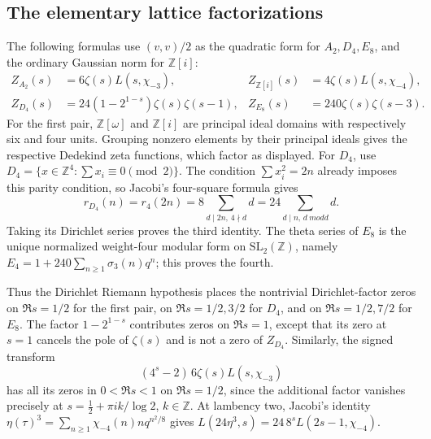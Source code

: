 \subsection{The elementary lattice factorizations}
The following formulas use $(v,v)/2$ as the quadratic form for $A_2,D_4,E_8$,
and the ordinary Gaussian norm for $\mathbb Z[i]$:
\begin{align}
 Z_{A_2}(s)&=6\zeta(s)L(s,\chi_{-3}),&
 Z_{\mathbb Z[i]}(s)&=4\zeta(s)L(s,\chi_{-4}),\label{eq:CM-Epstein}\\
 Z_{D_4}(s)&=24(1-2^{1-s})\zeta(s)\zeta(s-1),&
 Z_{E_8}(s)&=240\zeta(s)\zeta(s-3).\label{eq:DE-Epstein}
\end{align}
For the first pair, $\mathbb Z[\omega]$ and $\mathbb Z[i]$ are principal
ideal domains with respectively six and four units.  Grouping nonzero
elements by their principal ideals gives the respective Dedekind zeta
functions, which factor as displayed.  For $D_4$, use
$D_4=\{x\in\mathbb Z^4:\sum x_i\equiv0\pmod2\}$.
The condition $\sum x_i^2=2n$ already imposes this parity condition, so
Jacobi's four-square formula gives
\[
 r_{D_4}(n)=r_4(2n)=8\sum_{d\mid2n,\,4\nmid d}d
       =24\sum_{d\mid n,\,d\ {
m odd}}d.
\]
Taking its Dirichlet series proves the third identity.  The theta series of
$E_8$ is the unique normalized weight-four modular form on
$\mathrm{SL}_2(\mathbb Z)$, namely $E_4=1+240\sum_{n\geq1}\sigma_3(n)q^n$;
this proves the fourth.

Thus the Dirichlet Riemann hypothesis places the nontrivial Dirichlet-factor
zeros on $\Re s=1/2$ for the first pair, on $\Re s=1/2,3/2$ for $D_4$,
and on $\Re s=1/2,7/2$ for $E_8$.  The factor $1-2^{1-s}$ contributes
zeros on $\Re s=1$, except that its zero at $s=1$ cancels the pole of
$\zeta(s)$ and is not a zero of $Z_{D_4}$.
Similarly, the signed transform
\[
 (4^s-2)\,6\zeta(s)L(s,\chi_{-3})
\]
has all its zeros in $0<\Re s<1$ on $\Re s=1/2$, since the additional
factor vanishes precisely at
$s=\tfrac12+\pi i k/\log2$, $k\in\mathbb Z$.
At lambency two, Jacobi's identity
$\eta(\tau)^3=\sum_{n\geq1}\chi_{-4}(n)nq^{n^2/8}$ gives
$L(24\eta^3,s)=24\,8^sL(2s-1,\chi_{-4})$.
